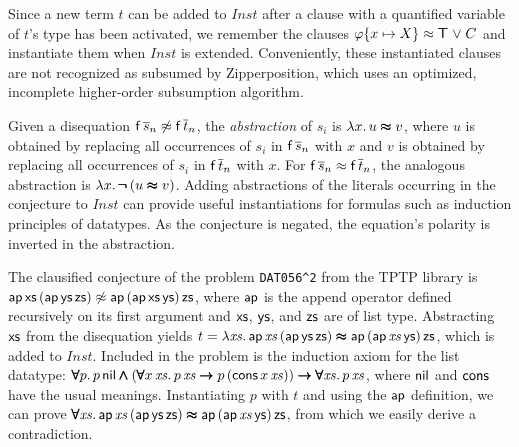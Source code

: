 \documentclass[smallcondensed,draft]{svjour3}     %
\begin{document}
Since a new term $t$ can be added to $\mathit{Inst}$ after a clause with a
quantified variable of $t$'s type has been activated, we 
remember the clauses $\varphi\{x \mapsto X\} \approx \pmb\top\allowbreak \mathrel\lor C$ and instantiate
them when $\mathit{Inst}$ is extended.
Conveniently, these instantiated clauses are not recognized as subsumed by
Zipperposition, which uses an optimized, incomplete higher-order subsumption
algorithm.

Given a disequation $\mathsf{f}\,\overline{s}_{n} \not\approx \mathsf{f}\,\overline{t}_{n}$, the
\emph{abstraction} of $s_i$ is $\lambda x.\, u \pmb\approx v$, where $u$ is obtained by
replacing all occurrences of $s_i$ in $\mathsf{f}\,\overline{s}_{n}$ with $x$ and $v$ is
obtained by replacing all occurrences of $s_i$ in
$\mathsf{f}\,\overline{t}_{n}$ with $x$. For $\mathsf{f}\,\overline{s}_{n} \approx
\mathsf{f}\,\overline{t}_{n}$, the analogous abstraction is $\lambda x.\, \pmb{\neg\,} (u \pmb\approx
v)$.
%
%
Adding abstractions of the literals occurring in the conjecture to $\mathit{Inst}$ can
provide useful instantiations for formulas such as induction principles of
datatypes. As the conjecture is negated,
the equation's polarity is inverted in the
abstraction. 

\begin{exa}
\label{ex:dat056-2}
The clausified conjecture of the problem \texttt{DAT056\^{}2}
\cite{ns-13-leo2sh} from the TPTP library is $\mathsf{ap} \, \mathsf{xs}
\, (\mathsf{ap} \, \mathsf{ys} \, \mathsf{zs}) \not\approx \mathsf{ap} \, (\mathsf{ap} \, \mathsf{xs} \,
\mathsf{ys}) \, \mathsf{zs}$, where $\mathsf{ap}$ is the append operator defined
recursively on its first argument and $\mathsf{xs}$, $\mathsf{ys}$, and $\mathsf{zs}$ are
of list type. Abstracting $\mathsf{xs}$ from the disequation yields $t = \lambda \mathit{xs}.\, \mathsf{ap} \, \mathit{xs} \, (\mathsf{ap} \, \mathsf{ys} \, \mathsf{zs})
\allowbreak\pmb\approx\allowbreak \mathsf{ap} \, (\mathsf{ap} \, \mathit{xs} \, \mathsf{ys}) \, \mathsf{zs}$, which is added
to $\mathit{Inst}$.
Included in the problem is the induction axiom
for the list datatype: $\pmb\forall p. \, p \, \mathsf{nil} \pmb\land (\pmb\forall x \,
\mathit{xs}. \, p \, \mathit{xs} \pmb\rightarrow\allowbreak p \, (\mathsf{cons} \, x \,
\mathit{xs})) \pmb\rightarrow\allowbreak \pmb\forall \mathit{xs}. \, p \, \mathit{xs}$, where
$\mathsf{nil}$ and $\mathsf{cons}$ have the usual meanings.
Instantiating $p$ with $t$ and
using the $\mathsf{ap}$ definition, we can prove
$\pmb\forall \mathit{xs}. \, \mathsf{ap} \, \mathit{xs} \, (\mathsf{ap} \, \mathsf{ys} \, \mathsf{zs})
\pmb\approx \mathsf{ap} \, (\mathsf{ap} \, \mathit{xs} \, \mathsf{ys}) \, \mathsf{zs}$,
from which we easily derive a contradiction.
\end{exa}
\end{document}
